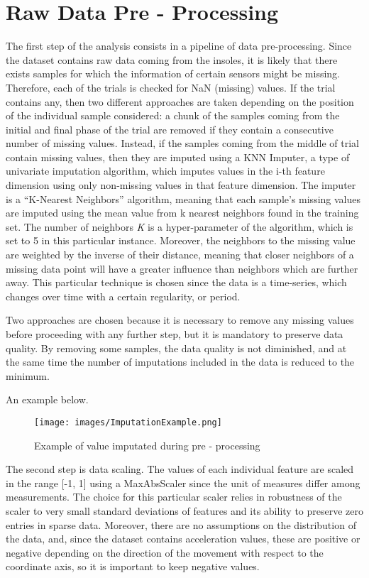 \section{Raw Data Pre - Processing}
The first step of the analysis consists in a pipeline of data pre-processing. Since the dataset contains raw data coming from the insoles, it is likely that there exists samples for which the information of certain sensors might be missing. Therefore, each of the trials is checked for NaN (missing) values. 
If the trial contains any, then two different approaches are taken depending on the position of the individual sample considered: a chunk of the samples coming from the initial and final phase of the trial are removed if they contain a consecutive number of missing values. Instead, if the samples coming from the middle of trial contain missing values, then they are imputed using a KNN Imputer, a type of univariate imputation algorithm, which imputes values in the i-th feature dimension using only non-missing values in that feature dimension.
The imputer is a \enquote{K-Nearest Neighbors} algorithm, meaning that each sample’s missing values are imputed using the mean value from k nearest neighbors found in the training set.
The number of neighbors \textit{K} is a hyper-parameter of the algorithm, which is set to 5 in this particular instance. Moreover, the neighbors to the missing value are weighted by the inverse of their distance, meaning that closer neighbors of a missing data point will have a greater influence than neighbors which are further away. This particular technique is chosen since the data is a time-series, which changes over time with a certain regularity, or period.

Two approaches are chosen because it is necessary to remove any missing values before proceeding with any further step, but it is mandatory to preserve data quality. By removing some samples, the data quality is not diminished, and at the same time the number of imputations included in the data is reduced to the minimum.

An example below.
\begin{figure}[ht!]
    \centering
    \texttt{[image: images/ImputationExample.png]}
    \caption{Example of value imputated during pre - processing}
    \label{fig:imputation}
\end{figure}


The second step is data scaling. The values of each individual feature are scaled in the range [-1, 1] using a MaxAbsScaler since the unit of measures differ among measurements. The choice for this particular scaler relies in robustness of the scaler to very small standard deviations of features and its ability to preserve zero entries in sparse data. Moreover, there are no assumptions on the distribution of the data, and, since the dataset contains acceleration values, these are positive or negative depending on the direction of the movement with respect to the coordinate axis, so it is important to keep negative values.

